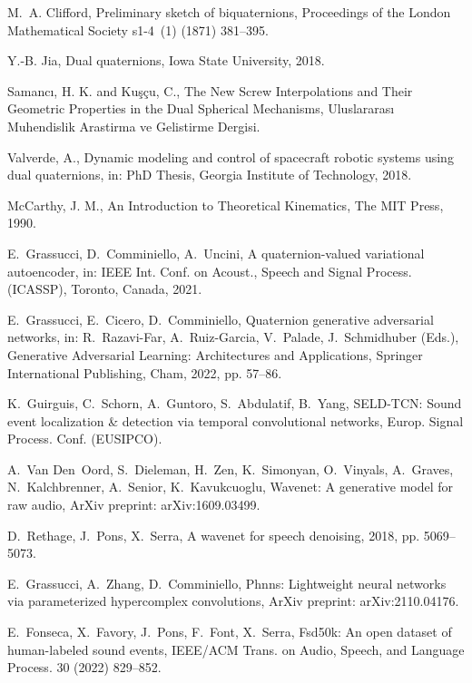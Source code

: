 \documentclass[3p, preprint, twocolumn]{elsarticle}
\begin{document}
\begin{thebibliography}{10}
M.~A. Clifford, Preliminary sketch of biquaternions, Proceedings of the London
  Mathematical Society s1-4~(1) (1871) 381--395.

Y.-B. Jia, Dual quaternions, Iowa State University, 2018.

Samancı, H. K. and Kuşçu, C., The New
  Screw Interpolations and Their Geometric Properties in the Dual Spherical
  Mechanisms, Uluslararası Muhendislik Arastirma ve
  Gelistirme Dergisi.

Valverde, A., Dynamic modeling and control
  of spacecraft robotic systems using dual quaternions, in:
  PhD Thesis, Georgia Institute of
  Technology, 2018.

McCarthy, J. M., An Introduction to
  Theoretical Kinematics, The MIT Press,
  1990.

E.~Grassucci, D.~Comminiello, A.~Uncini, A quaternion-valued variational
  autoencoder, in: IEEE Int. Conf. on Acoust., Speech and Signal Process.
  ({ICASSP}), Toronto, Canada, 2021.

E.~Grassucci, E.~Cicero, D.~Comminiello, Quaternion generative adversarial
  networks, in: R.~Razavi-Far, A.~Ruiz-Garcia, V.~Palade, J.~Schmidhuber
  (Eds.), Generative Adversarial Learning: Architectures and Applications,
  Springer International Publishing, Cham, 2022, pp. 57--86.

K.~Guirguis, C.~Schorn, A.~Guntoro, S.~Abdulatif, B.~Yang, {SELD-TCN}: Sound
  event localization \& detection via temporal convolutional networks, Europ.
  Signal Process. Conf. ({EUSIPCO}).

A.~Van Den~Oord, S.~Dieleman, H.~Zen, K.~Simonyan, O.~Vinyals, A.~Graves,
  N.~Kalchbrenner, A.~Senior, K.~Kavukcuoglu, Wavenet: A generative model for
  raw audio, ArXiv preprint: arXiv:1609.03499.

D.~Rethage, J.~Pons, X.~Serra, A wavenet for speech denoising, 2018, pp.
  5069--5073.

E.~Grassucci, A.~Zhang, D.~Comminiello, Phnns: Lightweight neural networks via
  parameterized hypercomplex convolutions, ArXiv preprint: arXiv:2110.04176.

E.~Fonseca, X.~Favory, J.~Pons, F.~Font, X.~Serra, Fsd50k: An open dataset of
  human-labeled sound events, {IEEE/ACM} Trans. on Audio, Speech, and Language
  Process. 30 (2022) 829--852.


\end{thebibliography}
\end{document}
